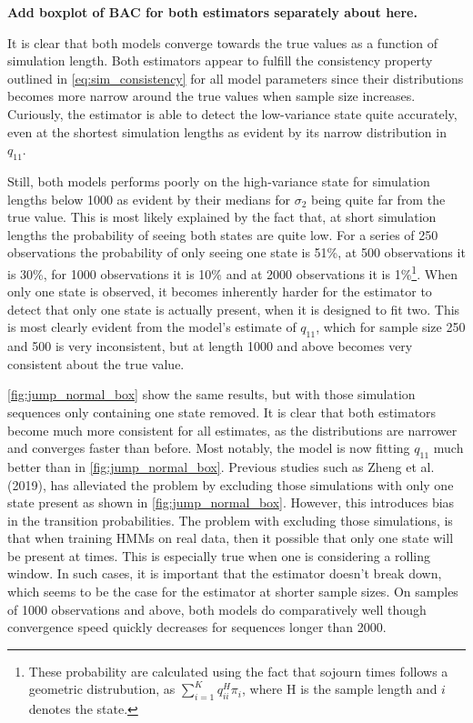\textbf{Add boxplot of BAC for both estimators separately about here.}

It is clear that both models converge towards the true values as a function of simulation length. Both estimators appear to fulfill the consistency property outlined in \cref{eq:sim_consistency} for all model parameters since their distributions becomes more narrow around the true values when sample size increases. Curiously, the \jump estimator is able to detect the low-variance state quite accurately, even at the shortest simulation lengths as evident by its narrow distribution in $q_{11}$.

Still, both models performs poorly on the high-variance state for simulation lengths below 1000 as evident by their medians for $\sigma_2$ being quite far from the true value. This is most likely explained by the fact that, at short simulation lengths the probability of seeing both states are quite low. For a series of 250 observations the probability of only seeing one state is 51\%, at 500 observations it is 30\%, for 1000 observations it is 10\% and at 2000 observations it is 1\%\footnote
{These probability are calculated using the fact that sojourn times follows a geometric distrubution, as $\sum_{i=1}^K q_{ii}^H\pi_i$, where H is the sample length and $i$ denotes the state.
}. 
When only one state is observed, it becomes inherently harder for the estimator to detect that only one state is actually present, when it is designed to fit two. This is most clearly evident from the \mle model's estimate of $q_{11}$, which for sample size 250 and 500 is very inconsistent, but at length 1000 and above becomes very consistent about the true value.

\cref{fig:jump_normal_box} show the same results, but with those simulation sequences only containing one state removed. It is clear that both estimators become much more consistent for all estimates, as the distributions are narrower and converges faster than before. Most notably, the \mle model is now fitting $q_{11}$ much better than in \cref{fig:jump_normal_box}. Previous studies such as Zheng et al. (2019), has alleviated the problem by excluding those simulations with only one state present as shown in \cref{fig:jump_normal_box}. However, this introduces bias in the transition probabilities. The problem with excluding those simulations, is that when training HMMs on real data, then it possible that only one state will be present at times. This is especially true when one is considering a rolling window. In such cases, it is important that the estimator doesn't break down, which seems to be the case for the \mle estimator at shorter sample sizes. On samples of 1000 observations and above, both models do comparatively well though convergence speed quickly decreases for sequences longer than 2000.


